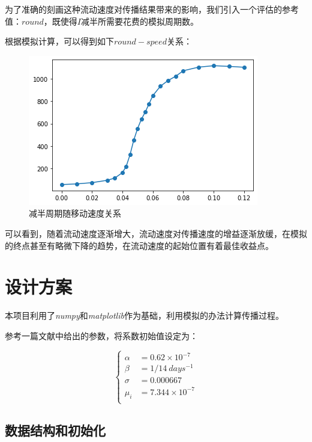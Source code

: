 \documentclass[a4paper]{ltxdoc}
\begin{document}
为了准确的刻画这种流动速度对传播结果带来的影响，我们引入一个评估的参考值：$round$，既使得$I$减半所需要花费的模拟周期数。

根据模拟计算，可以得到如下$round-speed$关系：

\begin{figure}[h]
    \centering
    \includegraphics[scale = 0.7]{images/3.png}
    \caption{减半周期随移动速度关系}
\end{figure}

可以看到，随着流动速度逐渐增大，流动速度对传播速度的增益逐渐放缓，在模拟的终点甚至有略微下降的趋势，在流动速度的起始位置有着最佳收益点。

\section{设计方案}

本项目利用了\textit{numpy}和\textit{matplotlib}作为基础，利用模拟的办法计算传播过程。

参考一篇文献中给出的参数，将系数初始值设定为：

\begin{equation}
    \left\{
    \begin{aligned}
        \alpha & = 0.62\times 10^{-7}  \\
        \beta  & = 1 / 14 \ days ^{-1} \\
        \sigma & = 0.000667            \\
        \mu_i  & = 7.344\times 10^{-7} \\
    \end{aligned}
    \right.
\end{equation}

\subsection{数据结构和初始化}
\end{document}
